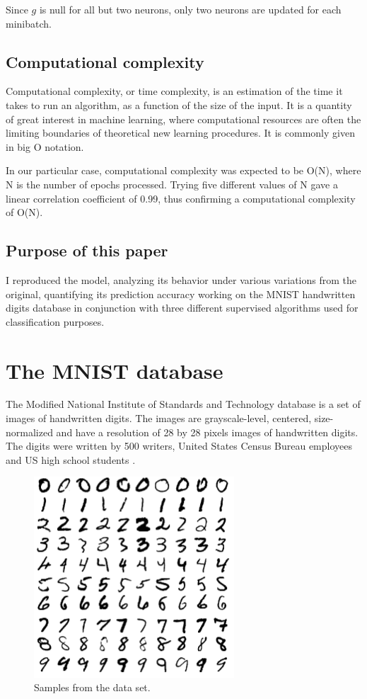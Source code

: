 \documentclass[a4paper]{report}
\begin{document}
Since $g$ is null for all but two neurons, only two neurons are updated for each minibatch.

\subsection{Computational complexity}

Computational complexity, or time complexity, is an estimation of the time it takes to run an algorithm, as a function of the size of the input.
It is a quantity of great interest in machine learning, where computational resources are often the limiting boundaries of theoretical new learning procedures.
It is commonly given in big O notation.

In our particular case, computational complexity was expected to be O(N), where N is the number of epochs processed.
Trying five different values of N gave a linear correlation coefficient of 0.99, thus confirming a computational complexity of O(N).

\subsection{Purpose of this paper}

I reproduced the model, analyzing its behavior under various variations from the original, quantifying its prediction accuracy working on the MNIST handwritten digits database in conjunction with three different supervised algorithms used for classification purposes.

\section{The MNIST database}

The Modified National Institute of Standards and Technology database is a set of images of handwritten digits. The images are grayscale-level, centered, size-normalized and have a resolution of 28 by 28 pixels images of handwritten digits.
The digits were written by 500 writers, United States Census Bureau employees and US high school students  \cite{MNISTweb}.

\begin{figure} [H]
	\centering
	\includegraphics [width=7.5cm ] {o/mnist.png}
	\caption{Samples from the data set.}
	\label{mnist}
\end{figure}
\end{document}
